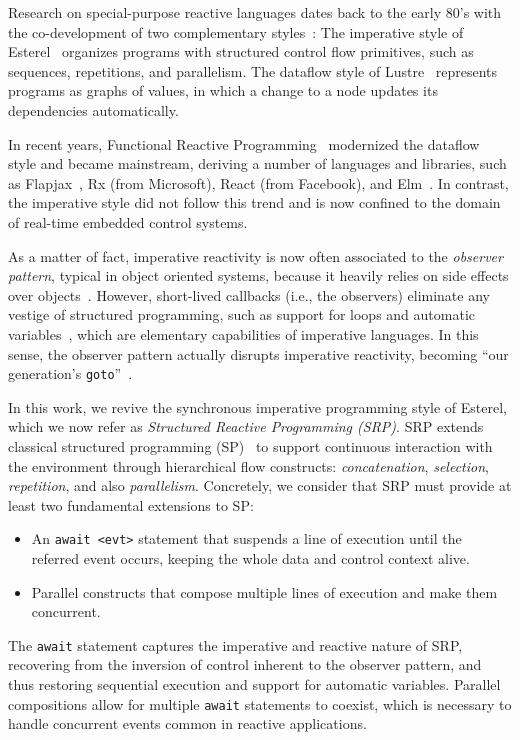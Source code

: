 \documentclass{acm_proc_article-sp}
\newcommand{\code}[1] {{\small{\texttt{#1}}}}
\newcommand{\1}{\;}
\newcommand{\2}{\;\;}
\newcommand{\3}{\;\;\;}
\newcommand{\5}{\;\;\;\;\;}
\begin{document}
Research on special-purpose reactive languages dates back to the early 80's 
with the co-development of two complementary 
styles~\cite{rp.twelve,rp.hypothesis}:
%
The imperative style of Esterel~\cite{esterel.ieee91} organizes programs with 
structured control flow primitives, such as sequences, repetitions, and 
parallelism.
%
The dataflow style of Lustre~\cite{lustre.ieee91} represents programs as graphs 
of values, in which a change to a node updates its dependencies automatically.

In recent years, Functional Reactive Programming~\cite{frp.principles} 
modernized the dataflow style and became mainstream, deriving a number of 
languages and libraries, such as Flapjax~\cite{frp.flapjax}, Rx (from 
Microsoft), React (from Facebook), and Elm~\cite{frp.elm}.
%
In contrast, the imperative style did not follow this trend and is now confined 
to the domain of real-time embedded control systems.

As a matter of fact, imperative reactivity is now often associated to the 
\emph{observer pattern}, typical in object oriented systems, because it heavily 
relies on side effects over objects~\cite{rp.deprecating,rp.rescala}.
%
However, short-lived callbacks (i.e., the observers) eliminate any vestige of 
structured programming, such as support for loops and automatic 
variables~\cite{sync_async.cooperative}, which are elementary capabilities of 
imperative languages.
%
In this sense, the observer pattern actually disrupts imperative reactivity, 
becoming ``our generation's \code{goto}''~\cite{dij.goto,rp.goto,elm.goto}.

In this work, we revive the synchronous imperative programming style of 
Esterel, which we now refer as \emph{Structured Reactive Programming (SRP)}.
%
SRP extends classical structured programming (SP)~\cite{dij.notes} to support 
continuous interaction with the environment through hierarchical flow 
constructs: \emph{concatenation}, \emph{selection}, \emph{repetition}, and also 
\emph{parallelism}.
%
Concretely, we consider that SRP must provide at least two fundamental 
extensions to SP:
%
\begin{itemize}
\item An \code{await <evt>} statement that suspends a line of execution until 
the referred event occurs, keeping the whole data and control context alive.
\item Parallel constructs that compose multiple lines of execution and make 
them concurrent.
\end{itemize}
%
The \code{await} statement captures the imperative and reactive nature of SRP, 
recovering from the inversion of control inherent to the observer pattern, and 
thus restoring sequential execution and support for automatic variables.
Parallel compositions allow for multiple \code{await} statements to coexist, 
which is necessary to handle concurrent events common in reactive applications.
\end{document}
